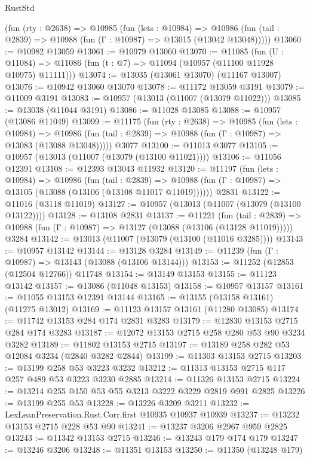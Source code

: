 \begin{lexlean}{RustStd}
\begin{coremodule}
{\begin{coremodule}
{{{{{{{{{{{{{{{{{{{{{{{{{{{{{{{{{    (fun (rty : @2638) =>
    @10985
      (fun (lets : @10984) =>
      @10986 (fun (tail : @2839) => @10988 (fun (Γ : @10987) => @13015 (@13042 @13048)))))
@13060 := @10982 @13059
@13061 := @10979 @13060
@13070 := @11085
    (fun (U : @11084) => @11086 (fun (t : @7) => @11094 (@10957 (@11100 @11928 @10975) @11111)))
@13074 := @13035 (@13061 @13070) (@11167 @13007)
@13076 := @10942 @13060 @13070
@13078 := @11172 @13059 @3191
@13079 := @11009 @3191
@13083 := @10957 (@13013 (@11007 (@13079 @11022)))
@13085 := @13038 (@11044 @3191)
@13086 := @11028 @13085
@13088 := @10957 (@13086 @11049)
@13099 := @11175
    (fun (rty : @2638) =>
    @10985
      (fun (lets : @10984) =>
      @10986 (fun (tail : @2839) => @10988 (fun (Γ : @10987) => @13083 (@13088 @13048)))))
    @3077
@13100 := @11013 @3077
@13105 := @10957 (@13013 (@11007 (@13079 (@13100 @11021))))
@13106 := @11056 @12391
@13108 := @12393 @13043 @11932
@13120 := @11197
    (fun (lets : @10984) =>
    @10986
      (fun (tail : @2839) =>
      @10988 (fun (Γ : @10987) => @13105 (@13088 (@13106 (@13108 @11017 @11019))))))
    @2831
@13122 := @11016 (@3118 @11019)
@13127 := @10957 (@13013 (@11007 (@13079 (@13100 @13122))))
@13128 := @13108 @2831
@13137 := @11221
    (fun (tail : @2839) => @10988 (fun (Γ : @10987) => @13127 (@13088 (@13106 (@13128 @11019)))))
    @3284
@13142 := @13013 (@11007 (@13079 (@13100 (@11016 @3285))))
@13143 := @10957 @13142
@13144 := @13128 @3284
@13149 := @11239 (fun (Γ : @10987) => @13143 (@13088 (@13106 @13144)))
@13153 := @11252 (@12853 (@12504 @12766)) @11748
@13154 := @13149 @13153
@13155 := @11123 @13142
@13157 := @13086 (@11048 @13153)
@13158 := @10957 @13157
@13161 := @11055 @13153 @12391 @13144
@13165 := @13155 (@13158 @13161) (@11275 @13012)
@13169 := @11123 @13157 @13161 (@11280 @13085)
@13174 := @11742 @13153 @284 @174 @2831 @3283
@13179 := @12830 @13153 @2715 @284 @174 @3283
@13187 := @12072 @13153 @2715 @258 @280 @53 @90 @3234 @3282
@13189 := @11802 @13153 @2715
@13197 := @13189 @258 @282 @53 @12084 @3234 (@2840 @3282 @2844)
@13199 := @11303 @13153 @2715
@13203 := @13199 @258 @53 @3223 @3232
@13212 := @11313 @13153 @2715 @117 @257 @489 @53 @3223 @3230 @2885
@13214 := @11326 @13153 @2715
@13224 := @13214 @255 @150 @53 @55 @3213 @3222 @3229 @2819 @991 @2825
@13226 := @13199 @255 @53
@13228 := @13226 @3209 @3211
@13232 := LexLeanPreservation.Rust.Corr.first @10935 @10937 @10939
@13237 := @13232 @13153 @2715 @228 @53 @90
@13241 := @13237 @3206 @2967 @959 @2825
@13243 := @11342 @13153 @2715
@13246 := @13243 @179 @174 @179
@13247 := @13246 @3206
@13248 := @11351 @13153
@13250 := @11350 (@13248 @179)
}}}}}}}}}}}}}}}}}}}}}}}}}}}}}}}}}
\end{coremodule}}
\end{coremodule}
\end{lexlean}

